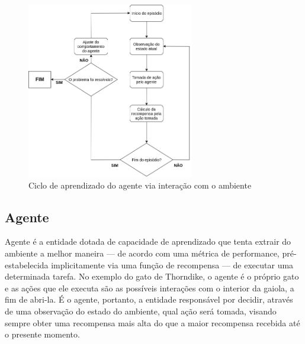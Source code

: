 \documentclass[cic,tc]{iiufrgs}
\begin{document}
    
    \begin{figure}
        \caption{Ciclo de aprendizado do agente via interação com o ambiente}
        \begin{center}
          \includegraphics[width=0.65\textwidth]{fluxo_ar.png}
        \end{center}
        \label{fig:fluxo_ar}
    \end{figure}
    
    
    \subsection{Agente}
    Agente é a entidade dotada de capacidade de aprendizado que tenta extrair do ambiente a melhor maneira --- de acordo com uma
    métrica de performance, pré-estabelecida implicitamente via uma função de recompensa --- de executar uma determinada tarefa.
    No exemplo do gato de Thorndike, o agente é o próprio gato e
    as ações que ele executa são as possíveis interações com o interior da gaiola, a fim de abri-la. É o agente, portanto, a entidade responsável
    por decidir, através de uma observação do estado do ambiente, qual ação será tomada, visando sempre obter uma
    recompensa mais alta do que a maior recompensa recebida até o presente momento.
    
\end{document}
